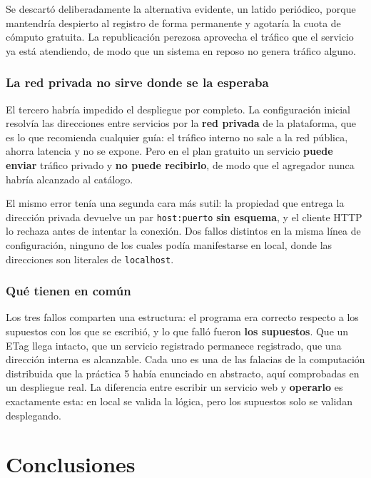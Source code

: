 \documentclass[12pt]{article}
\begin{document}
Se descartó deliberadamente la alternativa evidente, un latido periódico, porque mantendría despierto al registro de forma permanente y agotaría la cuota de cómputo gratuita. La republicación perezosa aprovecha el tráfico que el servicio ya está atendiendo, de modo que un sistema en reposo no genera tráfico alguno.

\subsubsection*{La red privada no sirve donde se la esperaba}

El tercero habría impedido el despliegue por completo. La configuración inicial resolvía las direcciones entre servicios por la \textbf{red privada} de la plataforma, que es lo que recomienda cualquier guía: el tráfico interno no sale a la red pública, ahorra latencia y no se expone. Pero en el plan gratuito un servicio \textbf{puede enviar} tráfico privado y \textbf{no puede recibirlo}, de modo que el agregador nunca habría alcanzado al catálogo.

El mismo error tenía una segunda cara más sutil: la propiedad que entrega la dirección privada devuelve un par \texttt{host:puerto} \textbf{sin esquema}, y el cliente HTTP lo rechaza antes de intentar la conexión. Dos fallos distintos en la misma línea de configuración, ninguno de los cuales podía manifestarse en local, donde las direcciones son literales de \texttt{localhost}.

\subsubsection*{Qué tienen en común}

Los tres fallos comparten una estructura: el programa era correcto respecto a los supuestos con los que se escribió, y lo que falló fueron \textbf{los supuestos}. Que un ETag llega intacto, que un servicio registrado permanece registrado, que una dirección interna es alcanzable. Cada uno es una de las falacias de la computación distribuida que la práctica 5 había enunciado en abstracto, aquí comprobadas en un despliegue real. La diferencia entre escribir un servicio web y \textbf{operarlo} es exactamente esta: en local se valida la lógica, pero los supuestos solo se validan desplegando.

\section{Conclusiones}
\end{document}
